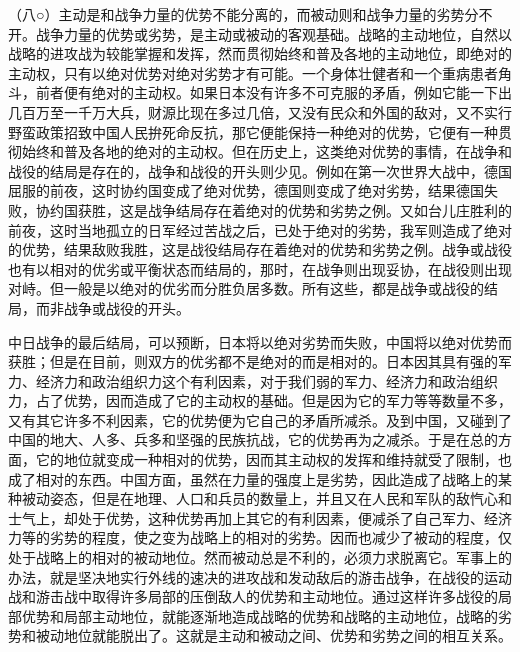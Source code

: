 \documentclass[UTF8, 12pt, a4paper]{ctexrep}
\begin{document}
（八○）主动是和战争力量的优势不能分离的，而被动则和战争力量的劣势分不开。战争力量的优势或劣势，是主动或被动的客观基础。战略的主动地位，自然以战略的进攻战为较能掌握和发挥，然而贯彻始终和普及各地的主动地位，即绝对的主动权，只有以绝对优势对绝对劣势才有可能。一个身体壮健者和一个重病患者角斗，前者便有绝对的主动权。如果日本没有许多不可克服的矛盾，例如它能一下出几百万至一千万大兵，财源比现在多过几倍，又没有民众和外国的敌对，又不实行野蛮政策招致中国人民拚死命反抗，那它便能保持一种绝对的优势，它便有一种贯彻始终和普及各地的绝对的主动权。但在历史上，这类绝对优势的事情，在战争和战役的结局是存在的，战争和战役的开头则少见。例如在第一次世界大战中，德国屈服的前夜，这时协约国变成了绝对优势，德国则变成了绝对劣势，结果德国失败，协约国获胜，这是战争结局存在着绝对的优势和劣势之例。又如台儿庄胜利的前夜，这时当地孤立的日军经过苦战之后，已处于绝对的劣势，我军则造成了绝对的优势，结果敌败我胜，这是战役结局存在着绝对的优势和劣势之例。战争或战役也有以相对的优劣或平衡状态而结局的，那时，在战争则出现妥协，在战役则出现对峙。但一般是以绝对的优劣而分胜负居多数。所有这些，都是战争或战役的结局，而非战争或战役的开头。

中日战争的最后结局，可以预断，日本将以绝对劣势而失败，中国将以绝对优势而获胜；但是在目前，则双方的优劣都不是绝对的而是相对的。日本因其具有强的军力、经济力和政治组织力这个有利因素，对于我们弱的军力、经济力和政治组织力，占了优势，因而造成了它的主动权的基础。但是因为它的军力等等数量不多，又有其它许多不利因素，它的优势便为它自己的矛盾所减杀。及到中国，又碰到了中国的地大、人多、兵多和坚强的民族抗战，它的优势再为之减杀。于是在总的方面，它的地位就变成一种相对的优势，因而其主动权的发挥和维持就受了限制，也成了相对的东西。中国方面，虽然在力量的强度上是劣势，因此造成了战略上的某种被动姿态，但是在地理、人口和兵员的数量上，并且又在人民和军队的敌忾心和士气上，却处于优势，这种优势再加上其它的有利因素，便减杀了自己军力、经济力等的劣势的程度，使之变为战略上的相对的劣势。因而也减少了被动的程度，仅处于战略上的相对的被动地位。然而被动总是不利的，必须力求脱离它。军事上的办法，就是坚决地实行外线的速决的进攻战和发动敌后的游击战争，在战役的运动战和游击战中取得许多局部的压倒敌人的优势和主动地位。通过这样许多战役的局部优势和局部主动地位，就能逐渐地造成战略的优势和战略的主动地位，战略的劣势和被动地位就能脱出了。这就是主动和被动之间、优势和劣势之间的相互关系。
\end{document}
